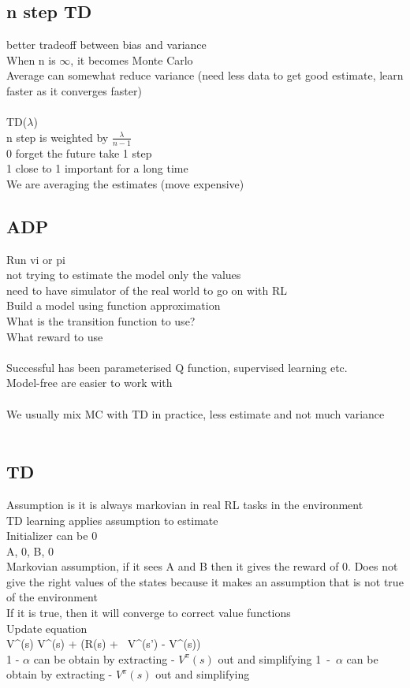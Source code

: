 \documentclass[11pt]{article}
\begin{document}
\subsection*{n step TD}
better tradeoff between bias and variance
\\
When n is $\infty$, it becomes Monte Carlo\\
Average can somewhat reduce variance (need less data to get good estimate, learn faster as it converges faster)\\
\\
TD($\lambda$) \\
n step is weighted by $\frac{\lambda}{n-1}$\\
0 forget the future take 1 step\\
1 close to 1 important for a long time
\\
We are averaging the estimates (move expensive)
\\
\subsection*{ADP}
Run vi or pi\\
not trying to estimate the model only the values
\\
need to have simulator of the real world to go on with RL
\\
Build a model using function approximation\\
What is the transition function to use?\\
What reward to use\\
\\
Successful has been parameterised Q function, supervised learning etc.
\\
Model-free are easier to work with\\
\\
We usually mix MC with TD in practice, less estimate and not much variance\\
\\
\subsection*{TD}
Assumption is it is always markovian in real RL tasks in the environment\\
TD learning applies assumption to estimate\\
Initializer can be 0\\
A, 0, B, 0\\
Markovian assumption, if it sees A and B then it gives the reward of 0.
Does not give the right values of the states because it makes an assumption that is not true of the environment\\
If it is true, then it will converge to  correct value functions\\
Update equation\\
 V^{\pi}(s) \leftarrow V^{\pi}(s) + \alpha(R(s) + \gamma\ V^{\pi}(s') - V^{\pi}(s))
 \\
 1 - $\alpha$ can be obtain by extracting - $V^{\pi}(s)$ out and simplifying
 1\ -\ $\alpha$ can be obtain by extracting - $V^{\pi}(s)$ out and simplifying
\end{document}
